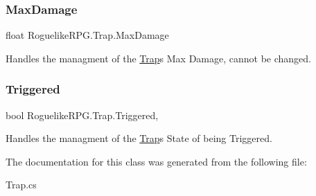 \subsubsection{\texorpdfstring{Max\+Damage}{MaxDamage}}
{\footnotesize\ttfamily float Roguelike\+R\+P\+G.\+Trap.\+Max\+Damage\hspace{0.3cm}{\ttfamily [get]}}



Handles the managment of the \mbox{\hyperlink{class_roguelike_r_p_g_1_1_trap}{Trap}}\textquotesingle{}s Max Damage, cannot be changed. 

\mbox{\label{class_roguelike_r_p_g_1_1_trap_a2be484e07ac0dba84b5f1a8d5235db67}} 
\subsubsection{\texorpdfstring{Triggered}{Triggered}}
{\footnotesize\ttfamily bool Roguelike\+R\+P\+G.\+Trap.\+Triggered\hspace{0.3cm}{\ttfamily [get]}, {\ttfamily [set]}}



Handles the managment of the \mbox{\hyperlink{class_roguelike_r_p_g_1_1_trap}{Trap}}\textquotesingle{}s State of being Triggered. 



The documentation for this class was generated from the following file\+:\begin{DoxyCompactItemize}
\item 
Trap.\+cs\end{DoxyCompactItemize}
